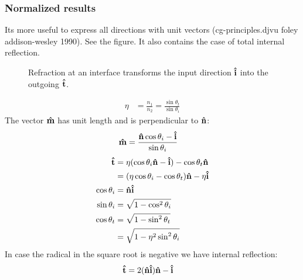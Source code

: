 \documentclass[twocolumn,DIV19]{scrartcl}
\begin{document}
\subsubsection{Normalized results}
Its more useful to express all directions with unit vectors
(cg-principles.djvu foley addison-wesley 1990). See the figure.
It also contains the case of total internal reflection.
 \begin{figure}
   \centering
   
   \caption{Refraction at an interface transforms the input direction
     $\mathbf{\hat{i}}$ into the outgoing $\mathbf{\hat{t}}$.}
 \end{figure}
 \begin{align}
   \eta&=\frac{n_1}{n_2}=\frac{\sin\theta_t}{\sin\theta_i}
 \end{align}
 The vector $\mathbf{\hat{m}}$ has unit length and is perpendicular to $\mathbf{\hat{n}}$:
 \begin{align}
   \mathbf{\hat{m}}&=\frac{\mathbf{\hat{n}}\cos\theta_i - \mathbf{\hat{i}}}{\sin\theta_i}
 \end{align}
 \begin{align}
   \mathbf{\hat{t}}&=\eta(\cos\theta_i\mathbf{\hat{n}}-\mathbf{\hat{i}})-\cos\theta_t\mathbf{\hat{n}}\\
   &=(\eta\cos\theta_i-\cos\theta_t)\mathbf{\hat{n}}-\eta\mathbf{\hat{i}}\\
   \cos\theta_i&=\mathbf{\hat{n}}\mathbf{\hat{i}}\\
   \sin\theta_i&=\sqrt{1-\cos^2\theta_i}\\
   \cos\theta_t&=\sqrt{1-\sin^2\theta_t}\\
   &=\sqrt{1-\eta^2\sin^2\theta_i}
 \end{align}
 In case the radical in the square root is negative we have internal reflection:
 \begin{align}
   \mathbf{\hat{t}}&=2(\mathbf{\hat{n}}\mathbf{\hat{i}})\mathbf{\hat{n}}-\mathbf{\hat{i}}
 \end{align}
\end{document}
